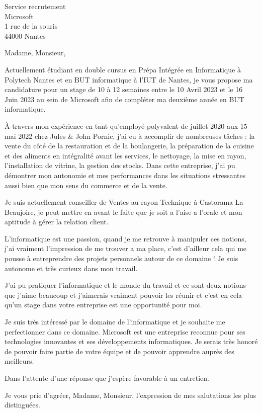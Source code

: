 \documentclass[
    french,
    sender,
    paper=a4,
    version=last,
    fontsize=9pt,
    DIV=12,
    BCOR=0mm
]{scrlttr2}
\begin{document}




\begin{letter}{
    Service recrutement\\
    Microsoft\\
    1 rue de la souris\\
    44000 Nantes
}

\opening{Madame, Monsieur,}


Actuellement étudiant en double cursus en Prépa Intégrée en Informatique à Polytech Nantes et en BUT informatique à l’IUT de Nantes, je vous propose ma candidature pour un stage de 10 à 12 semaines entre le 10 Avril 2023 et le 16 Juin 2023 au sein de Microsoft afin de compléter ma deuxième année en BUT informatique. 

À travers mon expérience en tant qu’employé polyvalent de juillet 2020 aux 15 mai 2022 chez Jules \& John Pornic, j’ai eu à accomplir de nombreuses tâches : la vente du côté de la restauration et de la boulangerie, la préparation de la cuisine et des aliments en intégralité avant les services, le nettoyage, la mise en rayon, l’installation de vitrine, la gestion des stocks. Dans cette entreprise, j’ai pu démontrer mon autonomie et mes performances dans les situations stressantes aussi bien que mon sens du commerce et de la vente.

Je suis actuellement conseiller de Ventes au rayon Technique à Castorama La Beaujoire, je peut mettre en avant le faite que je soit a l'aise a l'orale et mon aptitude à gérer la relation client.

L’informatique est une passion, quand je me retrouve à manipuler ces notions, j’ai vraiment l'impression de me trouver a ma place, c’est d’ailleur cela qui me pousse à entreprendre des projets personnels autour de ce domaine ! Je suis autonome et très curieux  dans mon travail.

J’ai pu pratiquer l’informatique et le monde du travail et ce sont deux notions que j’aime beaucoup et j’aimerais vraiment pouvoir les réunir et c’est en cela qu’un stage dans votre entreprise est une opportunité pour moi.

Je suis très intéressé par le domaine de l'informatique et je souhaite me perfectionner dans ce domaine. Microsoft est une entreprise reconnue pour ses technologies innovantes et ses développements informatiques. Je serais très honoré de pouvoir faire partie de votre équipe et de pouvoir apprendre auprès des meilleurs.

Dans l’attente d’une réponse que j'espère favorable à un entretien.

\closing{Je vous prie d’agréer, Madame, Monsieur, l’expression de mes salutations les plus distinguées.\\}

\end{letter}
\end{document}
